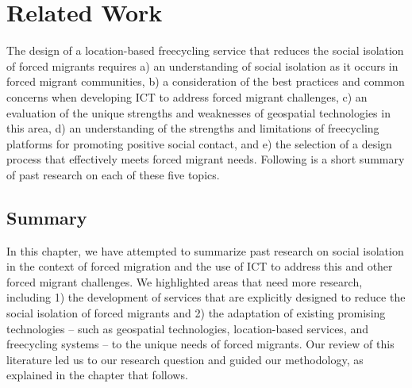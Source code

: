 \chapter{Related Work}
\label{cha:background}

The design of a location-based freecycling service that reduces the social isolation of forced migrants requires 
a) an understanding of social isolation as it occurs in forced migrant communities, 
b) a consideration of the best practices and common concerns when developing ICT to address forced migrant challenges,
c) an evaluation of the unique strengths and weaknesses of geospatial technologies in this area,
d) an understanding of the strengths and limitations of freecycling platforms for promoting positive social contact, and
e) the selection of a design process that effectively meets forced migrant needs.
Following is a short summary of past research on each of these five topics.







\section{Summary}

In this chapter, we have attempted to summarize past research on social isolation in the context of forced migration and the use of ICT to address this and other forced migrant challenges. We highlighted areas that need more research, including 1) the development of services that are explicitly designed to reduce the social isolation of forced migrants and 2) the adaptation of existing promising technologies – such as geospatial technologies, location-based services, and freecycling systems – to the unique needs of forced migrants. Our review of this literature led us to our research question and guided our methodology, as explained in the chapter that follows.